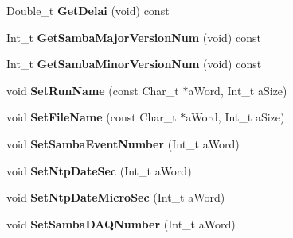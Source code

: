 \begin{DoxyCompactItemize}
\item 
\hypertarget{class_edw_samba_sub_record_base_ac86ba97d55226c8f030cbc549a0983e0}{
Double\_\-t {\bfseries GetDelai} (void) const }
\label{class_edw_samba_sub_record_base_ac86ba97d55226c8f030cbc549a0983e0}

\item 
\hypertarget{class_edw_samba_sub_record_base_a281a3c8b980775498a32657a8db07ac8}{
Int\_\-t {\bfseries GetSambaMajorVersionNum} (void) const }
\label{class_edw_samba_sub_record_base_a281a3c8b980775498a32657a8db07ac8}

\item 
\hypertarget{class_edw_samba_sub_record_base_aaac64c842375cb6e4d3ba53a2bb3f0b2}{
Int\_\-t {\bfseries GetSambaMinorVersionNum} (void) const }
\label{class_edw_samba_sub_record_base_aaac64c842375cb6e4d3ba53a2bb3f0b2}

\item 
\hypertarget{class_edw_samba_sub_record_base_a97e605886313c9b66e0093e0df3637d0}{
void {\bfseries SetRunName} (const Char\_\-t $\ast$aWord, Int\_\-t aSize)}
\label{class_edw_samba_sub_record_base_a97e605886313c9b66e0093e0df3637d0}

\item 
\hypertarget{class_edw_samba_sub_record_base_aa00201bd25e23950d3d15448564683f3}{
void {\bfseries SetFileName} (const Char\_\-t $\ast$aWord, Int\_\-t aSize)}
\label{class_edw_samba_sub_record_base_aa00201bd25e23950d3d15448564683f3}

\item 
\hypertarget{class_edw_samba_sub_record_base_a53c6c43c077bd1ea4049ea889afa2709}{
void {\bfseries SetSambaEventNumber} (Int\_\-t aWord)}
\label{class_edw_samba_sub_record_base_a53c6c43c077bd1ea4049ea889afa2709}

\item 
\hypertarget{class_edw_samba_sub_record_base_a8f6f53528324253730b232be632cb377}{
void {\bfseries SetNtpDateSec} (Int\_\-t aWord)}
\label{class_edw_samba_sub_record_base_a8f6f53528324253730b232be632cb377}

\item 
\hypertarget{class_edw_samba_sub_record_base_ad3e1e97291d341ab00ac9f12a9370d61}{
void {\bfseries SetNtpDateMicroSec} (Int\_\-t aWord)}
\label{class_edw_samba_sub_record_base_ad3e1e97291d341ab00ac9f12a9370d61}

\item 
\hypertarget{class_edw_samba_sub_record_base_ad1a7f147a0448d04d711f78373309e2d}{
void {\bfseries SetSambaDAQNumber} (Int\_\-t aWord)}
\label{class_edw_samba_sub_record_base_ad1a7f147a0448d04d711f78373309e2d}


\end{DoxyCompactItemize}
